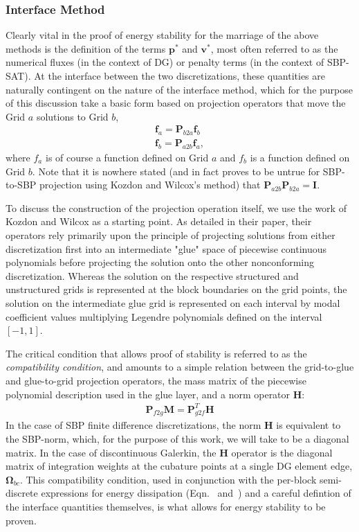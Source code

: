 \subsubsection{Interface Method} \label{sec:interface}

Clearly vital in the proof of energy stability for the marriage of the
above methods is the definition of the terms $\pmb{p}^*$ and $\pmb{v}^*$, most
often referred to as the numerical fluxes (in the context of DG) or penalty terms
(in the context of SBP-SAT). At the interface between the two discretizations, these
quantities are naturally contingent on the nature of the interface method, which
for the purpose of this discussion take a basic form based on projection operators
that move the Grid $a$ solutions to Grid $b$,
\begin{align}
\pmb{f}_{a} = \pmb{P}_{b2a}\pmb{f}_{b} \\
\pmb{f}_{b} = \pmb{P}_{a2b}\pmb{f}_{a},
\end{align}
where $f_{a}$ is of course a function defined on Grid $a$ and $f_{b}$ is a function
defined on Grid $b$. Note that it is nowhere stated (and in fact proves to be untrue
for SBP-to-SBP projection using Kozdon and Wilcox's method) that $\pmb{P}_{a2b}\pmb{P}_{b2a} = \pmb{I}$.

To discuss the construction of the projection operation itself, we use the work of
Kozdon and Wilcox as a starting point. As detailed in their paper, their operators rely primarily
upon the principle of projecting solutions from either discretization
first into an intermediate "glue" space of piecewise continuous polynomials
before projecting the solution onto the other nonconforming discretization. Whereas
the solution on the respective structured and unstructured grids is represented at
the block boundaries on the grid points, the solution on the intermediate glue grid
is represented on each interval by modal coefficient values multiplying Legendre
polynomials defined on the interval $[-1,1]$.

The critical condition that allows proof of stability is referred to as the
\emph{compatibility condition}, and amounts to a simple relation between the
grid-to-glue and glue-to-grid projection operators, the mass matrix of the
piecewise polynomial description used in the glue layer, and a norm operator
$\pmb{H}$:
\begin{align}
\pmb{P}_{f2g}\pmb{M} = \pmb{P}_{g2f}^{T}\pmb{H} \label{eq:compat}
\end{align}
In the case of SBP finite difference discretizations, the norm $\pmb{H}$ is equivalent
to the SBP-norm, which, for the purpose of this work, we will take to be
a diagonal matrix. In the case of discontinuous Galerkin, the $\pmb{H}$ operator is
the diagonal matrix of integration weights at the cubature points at a single
DG element edge, $\pmb{\Omega}_{bc}$.  This compatibility condition, used in conjunction with
the per-block semi-discrete expressions for energy dissipation (Eqn.~ and~)
and a careful defintion of the interface quantities themselves,
is what allows for energy stability to be proven.

